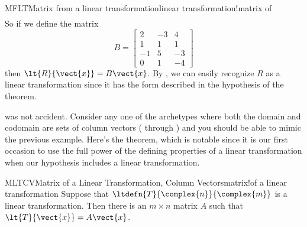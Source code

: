 \begin{example}{MFLT}{Matrix from a linear transformation}{linear transformation!matrix of}
\begin{align*}
%
\end{align*}
%
So if we define the matrix
%
\begin{equation*}
B=
\begin{bmatrix}
2&-3&4\\
1&1&1\\
-1&5&-3\\
0&1&-4
\end{bmatrix}
\end{equation*}
%
then $\lt{R}{\vect{x}}=B\vect{x}$.  By , we can easily recognize $R$ as a linear transformation since it has the form described in the hypothesis of the theorem.
%
\end{example}
%
 was not accident.  Consider any one of the archetypes where both the domain and codomain are sets of column vectors ( through ) and you should be able to mimic the previous example.  Here's the theorem, which is notable since it is our first occasion to use the full power of the defining properties of a linear transformation when our hypothesis includes a linear transformation.
%
\begin{theorem}{MLTCV}{Matrix of a Linear Transformation, Column Vectors}{matrix!of a linear transformation}
Suppose that $\ltdefn{T}{\complex{n}}{\complex{m}}$ is a linear transformation.  Then there is an $m\times n$ matrix $A$ such that $\lt{T}{\vect{x}}=A\vect{x}$.
\end{theorem}
%
